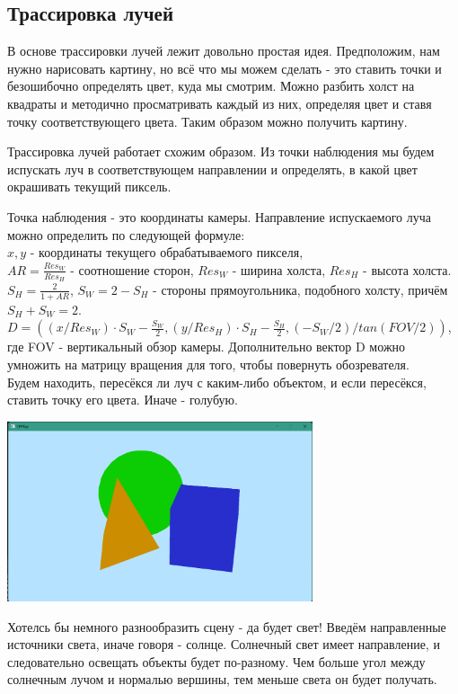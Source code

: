 \documentclass[a4paper,14pt]{extarticle}
\newcommand\makenewfig[3] {
    \captionsetup{format=imagecaption}
    \begin{center}
        #1
        \nopagebreak
        \captionof{figure}{#2}
        \nopagebreak
        \label{#3}
    \end{center}
}
\begin{document}
\subsection{Трассировка лучей}
В основе трассировки лучей лежит довольно простая идея. Предположим, нам нужно нарисовать картину, но 
всё что мы можем сделать - это ставить точки и безошибочно определять цвет, куда мы смотрим.
Можно разбить холст на квадраты и методично просматривать каждый из них, определяя цвет и ставя точку соответствующего цвета.
Таким образом можно получить картину. 

Трассировка лучей работает схожим образом. Из точки наблюдения мы будем испускать луч в соответствующем направлении и определять, 
в какой цвет окрашивать текущий пиксель.  

Точка наблюдения - это координаты камеры. 
Направление испускаемого луча можно определить по следующей формуле:\\
$x, y$ - координаты текущего обрабатываемого пикселя,\\
$AR = \frac{Res_W}{Res_H}$ - соотношение сторон, $Res_W$ - ширина холста, $Res_H$ - высота холста.\\
$S_H = \frac{2}{1 + AR}$, $S_W = 2 - S_H$ - стороны прямоугольника, подобного холсту, причём $S_H + S_W = 2$.\\
$D = ((x / Res_W) \cdot S_W - \frac{S_W}{2}, (y / Res_H) \cdot S_H - \frac{S_H}{2}, ( -S_W / 2 ) / tan( FOV / 2 ))$, где FOV - вертикальный обзор камеры.
Дополнительно вектор D можно умножить на матрицу вращения для того, чтобы повернуть обозревателя.\\

Будем находить, пересёкся ли луч с каким-либо объектом, и если пересёкся, ставить точку его цвета. Иначе - голубую.
\makenewfig{\includegraphics[width=90mm]{raytrace_1}}{Пересечение луча и фигуры}{ris:raytrace_1}

Хотелсь бы немного разнообразить сцену - да будет свет! Введём направленные источники света, иначе говоря - солнце. 
Солнечный свет имеет направление, и следовательно освещать объекты будет по-разному. Чем больше угол между солнечным лучом и нормалью вершины, тем меньше света он будет получать.
\end{document}
